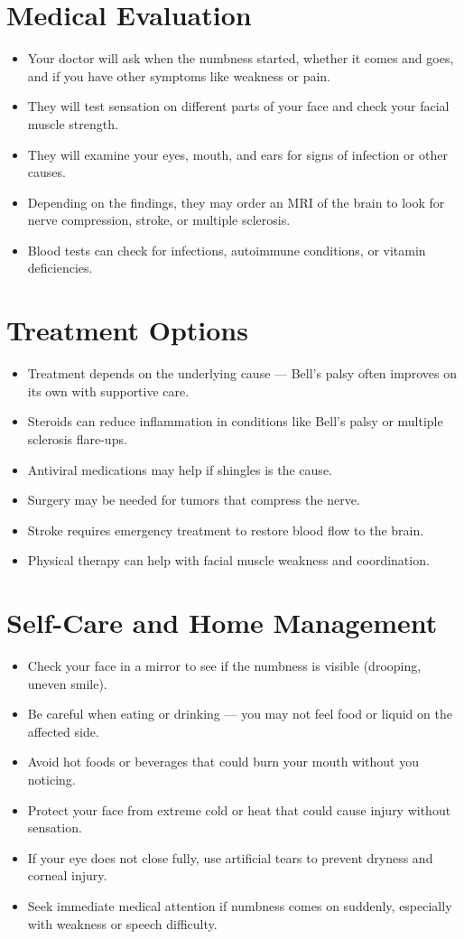 \section*{Medical Evaluation}
\begin{itemize}
  \item Your doctor will ask when the numbness started, whether it comes and goes, and if you have other symptoms like weakness or pain.
  \item They will test sensation on different parts of your face and check your facial muscle strength.
  \item They will examine your eyes, mouth, and ears for signs of infection or other causes.
  \item Depending on the findings, they may order an MRI of the brain to look for nerve compression, stroke, or multiple sclerosis.
  \item Blood tests can check for infections, autoimmune conditions, or vitamin deficiencies.
\end{itemize}

\section*{Treatment Options}
\begin{itemize}
  \item Treatment depends on the underlying cause — Bell's palsy often improves on its own with supportive care.
  \item Steroids can reduce inflammation in conditions like Bell's palsy or multiple sclerosis flare-ups.
  \item Antiviral medications may help if shingles is the cause.
  \item Surgery may be needed for tumors that compress the nerve.
  \item Stroke requires emergency treatment to restore blood flow to the brain.
  \item Physical therapy can help with facial muscle weakness and coordination.
\end{itemize}

\section*{Self-Care and Home Management}
\begin{itemize}
  \item Check your face in a mirror to see if the numbness is visible (drooping, uneven smile).
  \item Be careful when eating or drinking — you may not feel food or liquid on the affected side.
  \item Avoid hot foods or beverages that could burn your mouth without you noticing.
  \item Protect your face from extreme cold or heat that could cause injury without sensation.
  \item If your eye does not close fully, use artificial tears to prevent dryness and corneal injury.
  \item Seek immediate medical attention if numbness comes on suddenly, especially with weakness or speech difficulty.
\end{itemize}

